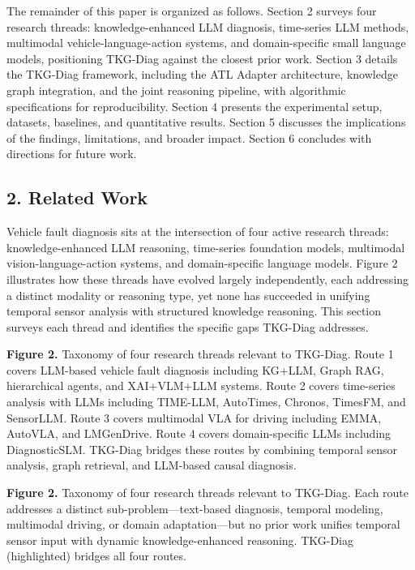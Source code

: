\documentclass[
  11pt,
]{article}
\newcounter{none} %
\begin{document}
The remainder of this paper is organized as follows. Section 2 surveys
four research threads: knowledge-enhanced LLM diagnosis, time-series LLM
methods, multimodal vehicle-language-action systems, and domain-specific
small language models, positioning TKG-Diag against the closest prior
work. Section 3 details the TKG-Diag framework, including the ATL
Adapter architecture, knowledge graph integration, and the joint
reasoning pipeline, with algorithmic specifications for reproducibility.
Section 4 presents the experimental setup, datasets, baselines, and
quantitative results. Section 5 discusses the implications of the
findings, limitations, and broader impact. Section 6 concludes with
directions for future work.

\newpage

\subsection{2. Related Work}\label{related-work}

Vehicle fault diagnosis sits at the intersection of four active research
threads: knowledge-enhanced LLM reasoning, time-series foundation
models, multimodal vision-language-action systems, and domain-specific
language models. Figure 2 illustrates how these threads have evolved
largely independently, each addressing a distinct modality or reasoning
type, yet none has succeeded in unifying temporal sensor analysis with
structured knowledge reasoning. This section surveys each thread and
identifies the specific gaps TKG-Diag addresses.

\textbf{Figure 2.} Taxonomy of four research threads relevant to
TKG-Diag. Route 1 covers LLM-based vehicle fault diagnosis including
KG+LLM, Graph RAG, hierarchical agents, and XAI+VLM+LLM systems. Route 2
covers time-series analysis with LLMs including TIME-LLM, AutoTimes,
Chronos, TimesFM, and SensorLLM. Route 3 covers multimodal VLA for
driving including EMMA, AutoVLA, and LMGenDrive. Route 4 covers
domain-specific LLMs including DiagnosticSLM. TKG-Diag bridges these
routes by combining temporal sensor analysis, graph retrieval, and
LLM-based causal diagnosis.

\textbf{Figure 2.} Taxonomy of four research threads relevant to
TKG-Diag. Each route addresses a distinct sub-problem---text-based
diagnosis, temporal modeling, multimodal driving, or domain
adaptation---but no prior work unifies temporal sensor input with
dynamic knowledge-enhanced reasoning. TKG-Diag (highlighted) bridges all
four routes.
\end{document}
